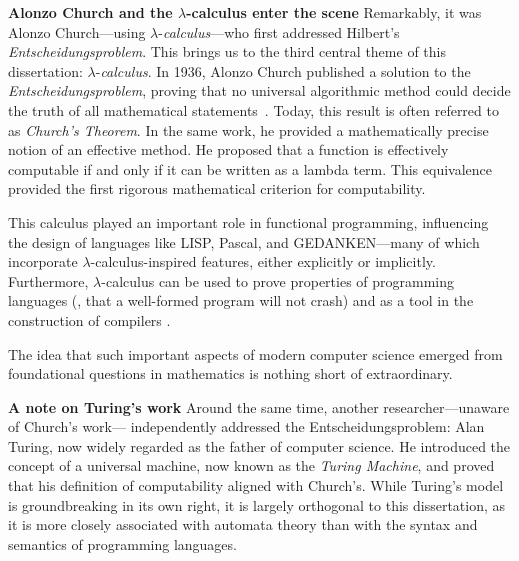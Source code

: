    

\noindent \textbf{Alonzo Church and the $\lambda$-calculus enter the scene}
Remarkably, it was Alonzo Church—using $\lambda$-\textit{calculus}—who first addressed Hilbert’s \emph{Entscheidungsproblem}. This brings us to the third central theme of this dissertation: $\lambda$-\textit{calculus}. In 1936, Alonzo Church published a solution to the \emph{Entscheidungsproblem}, proving that no universal algorithmic method could decide the truth of all mathematical statements~\cite{church1936}. Today, this result is often referred to as \emph{Church’s Theorem}. In the same work, he provided a mathematically precise notion of an effective method. He proposed that a function is effectively computable if and only if it can be written as a lambda term. This equivalence provided the first rigorous mathematical criterion for computability.

This calculus played an important role in functional programming, influencing the design of languages like LISP, Pascal, and GEDANKEN—many of which incorporate $\lambda$-calculus-inspired features, either explicitly or implicitly. Furthermore, $\lambda$-calculus can be used to prove properties of programming languages (\eg, that a well-formed program will not crash) and as a tool in the construction of compilers \cite{jonesImplementationFunctionalProgramming}.

The idea that such important aspects of modern computer science emerged from foundational questions in mathematics is nothing short of extraordinary.

\noindent \textbf{A note on Turing's work}
Around the same time, another researcher—unaware of Church’s work— independently addressed the Entscheidungsproblem: Alan Turing, now widely regarded as the father of computer science. He introduced the concept of a universal machine, now known as the \emph{Turing Machine}, and proved that his definition of computability aligned with Church’s. While Turing’s model is groundbreaking in its own right, it is largely orthogonal to this dissertation, as it is more closely associated with automata theory than with the syntax and semantics of programming languages.



